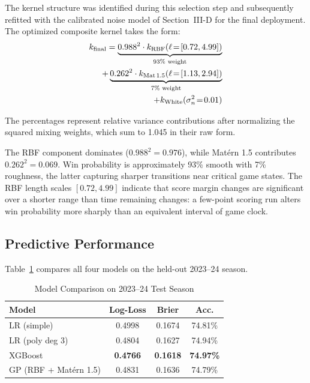 \documentclass[conference]{IEEEtran}
\begin{document}
The kernel structure was identified during this selection step and subsequently refitted with the calibrated noise model of Section~III-D for the final deployment. The optimized composite kernel takes the form:
%
\begin{equation}
\begin{split}
k_{\text{final}} = \underbrace{0.988^2 \cdot k_{\text{RBF}}(\ell\!=\![0.72, 4.99])}_{\text{93\% weight}} \\
+ \underbrace{0.262^2 \cdot k_{\text{Mat\,1.5}}(\ell\!=\![1.13, 2.94])}_{\text{7\% weight}} \\
+ k_{\text{White}}(\sigma_n^2\!=\!0.01)
\end{split}
\end{equation}

The percentages represent relative variance contributions after normalizing the squared mixing weights, which sum to 1.045 in their raw form.

The RBF component dominates ($0.988^2 = 0.976$), while Mat\'{e}rn 1.5 contributes $0.262^2 = 0.069$. Win probability is approximately 93\% smooth with 7\% roughness, the latter capturing sharper transitions near critical game states. The RBF length scales $[0.72, 4.99]$ indicate that score margin changes are significant over a shorter range than time remaining changes: a few-point scoring run alters win probability more sharply than an equivalent interval of game clock.

\subsection{Predictive Performance}

Table~\ref{tab:models} compares all four models on the held-out 2023--24 season.

\begin{table}[t]
\centering
\caption{Model Comparison on 2023--24 Test Season}
\label{tab:models}
\begin{tabular}{lccc}
\toprule
\textbf{Model} & \textbf{Log-Loss} & \textbf{Brier} & \textbf{Acc.} \\
\midrule
LR (simple) & 0.4998 & 0.1674 & 74.81\% \\
LR (poly deg 3) & 0.4804 & 0.1627 & 74.94\% \\
XGBoost & \textbf{0.4766} & \textbf{0.1618} & \textbf{74.97\%} \\
GP (RBF + Mat\'{e}rn 1.5) & 0.4831 & 0.1636 & 74.79\% \\
\bottomrule
\end{tabular}
\end{table}
\end{document}
